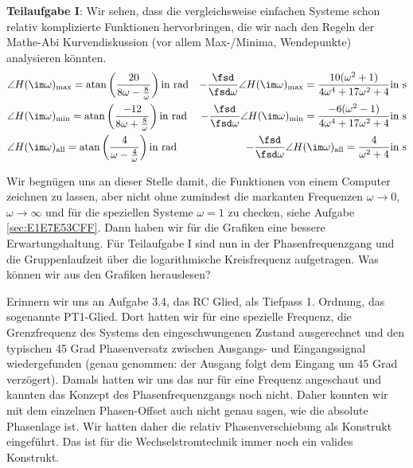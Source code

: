 \begin{Loesung}
\textbf{Teilaufgabe I}: Wir sehen, dass die vergleichsweise einfachen Systeme
schon relativ  komplizierte Funktionen hervorbringen, die wir nach den Regeln der
Mathe-Abi Kurvendiskussion (vor allem Max-/Minima, Wendepunkte) analysieren könnten.
%
\begin{align}
&\angle H(\im\omega)_\mathrm{max} =
\mathrm{atan}\left(\frac{20}{8\omega-\frac{8}{\omega}}\right)\text{in rad}
&-\frac{\fsd}{\fsd \omega} \angle H(\im\omega)_\mathrm{max}=
\frac{10(\omega^2+1)}{4\omega^4+17\omega^2+4}\text{in s}
\\
&\angle H(\im\omega)_\mathrm{min} =
\mathrm{atan}\left(\frac{-12}{8\omega+\frac{8}{\omega}}\right)\text{in rad}
&-\frac{\fsd}{\fsd \omega} \angle H(\im\omega)_\mathrm{min}=
\frac{-6(\omega^2-1)}{4\omega^4+17\omega^2+4}\text{in s}
\\
&\angle H(\im\omega)_\mathrm{all} =
\mathrm{atan}\left(\frac{4}{\omega-\frac{4}{\omega}}\right)\text{in rad}
&-\frac{\fsd}{\fsd \omega} \angle H(\im\omega)_\mathrm{all}=
\frac{4}{\omega^2+4}\text{in s}
\end{align}
%

Wir begnügen uns an dieser Stelle damit, die Funktionen von einem Computer zeichnen
zu lassen, aber nicht ohne zumindest die markanten Frequenzen $\omega\to 0$,
$\omega\to \infty$ und für die speziellen Systeme $\omega = 1$ zu checken, siehe
Aufgabe \ref{sec:E1E7E53CFF}. Dann haben wir für die Grafiken eine
bessere Erwartungshaltung.
%
Für Teilaufgabe I sind nun in
 der Phasenfrequenzgang
und die Gruppenlaufzeit über die logarithmische Kreisfrequenz aufgetragen.
%
Was können wir aus den Grafiken herauslesen?

Erinnern wir uns an Aufgabe 3.4,
das RC Glied, als Tiefpass 1. Ordnung, das sogenannte PT1-Glied.
Dort hatten wir für eine spezielle Frequenz, die Grenzfrequenz des Systems
den eingeschwungenen Zustand ausgerechnet und den typischen 45 Grad Phasenversatz
zwischen Ausgangs- und Eingangssignal wiedergefunden (genau genommen: der Ausgang
folgt dem Eingang um 45 Grad verzögert). Damals hatten wir uns das nur für
eine Frequenz angeschaut und kannten das Konzept des Phasenfrequenzgangs noch
nicht. Daher konnten wir mit dem einzelnen Phasen-Offset auch nicht genau sagen,
wie die absolute Phasenlage ist. Wir hatten daher die relativ Phasenverschiebung
als Konstrukt eingeführt. Das ist für die Wechselstromtechnik immer noch
ein valides Konstrukt.


\end{Loesung}
